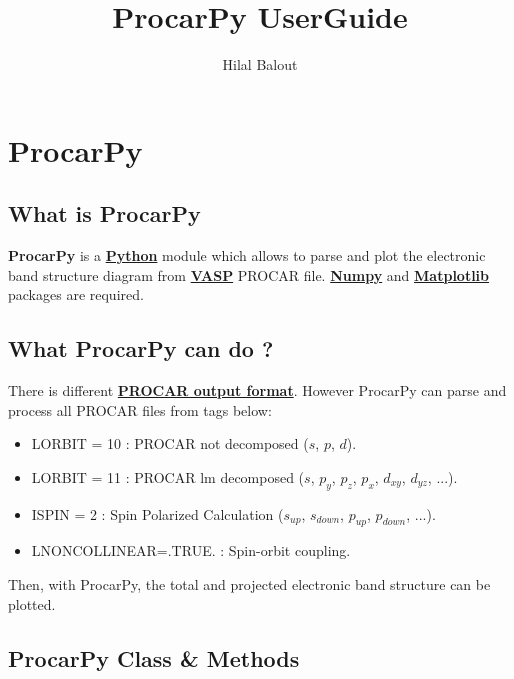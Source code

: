 \documentclass[11pt]{article}
\title{ProcarPy UserGuide}
\author{Hilal Balout}
\providecommand{\tightlist}{%
      \setlength{\itemsep}{0pt}\setlength{\parskip}{0pt}}
\begin{document}
    
    
    \maketitle
    
    

    
    \section{ProcarPy}\label{procarpy}

\subsection{What is ProcarPy}\label{what-is-procarpy}

\textbf{ProcarPy} is a \href{https://www.python.org/}{\textbf{Python}}
module which allows to parse and plot the electronic band structure
diagram from \href{https://www.vasp.at/}{\textbf{VASP}} PROCAR file.
\href{https://www.numpy.org/}{\textbf{Numpy}} and
\href{https://matplotlib.org/}{\textbf{Matplotlib}} packages are
required.

\subsection{What ProcarPy can do ?}\label{what-procarpy-can-do}

There is different
\href{https://cms.mpi.univie.ac.at/wiki/index.php/PROCAR}{\textbf{PROCAR
output format}}. However ProcarPy can parse and process all PROCAR files
from tags below:

\begin{itemize}
\tightlist
\item
  LORBIT = 10 : PROCAR not decomposed (\(s\), \(p\), \(d\)).
\item
  LORBIT = 11 : PROCAR lm decomposed (\(s\), \(p_y\), \(p_z\), \(p_x\),
  \(d_{xy}\), \(d_{yz}\), ...).
\item
  ISPIN = 2 : Spin Polarized Calculation (\(s_{up}\), \(s_{down}\),
  \(p_{up}\), \(p_{down}\), ...).
\item
  LNONCOLLINEAR=.TRUE. : Spin-orbit coupling.
\end{itemize}

Then, with ProcarPy, the total and projected electronic band structure
can be plotted.

\subsection{ProcarPy Class \& Methods}\label{procarpy-class-methods}
\end{document}
